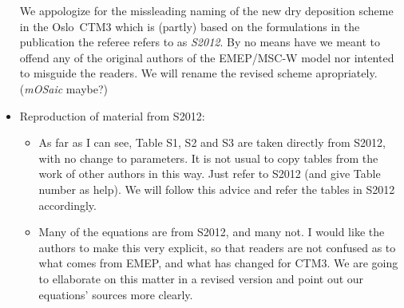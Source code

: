 \documentclass{scrartcl}
\begin{document}
\begin{itemize}
  We appologize for the missleading naming of the new dry deposition scheme in the Oslo~CTM3 which is (partly) based on the formulations in the publication the referee refers to as \emph{S2012}. By no means have we meant to offend any of the original authors of the EMEP/MSC-W model nor intented to misguide the readers. We will rename the revised scheme apropriately. (\emph{mOSaic} maybe?) 
\item {\color{blue} Reproduction of material from S2012:}
  \begin{itemize}
  \item {\color{blue} As far as I can see, Table S1, S2 and S3 are taken directly from S2012, with no change to parameters. It is not usual to copy tables from the work of other authors in this way.
    Just refer to S2012 (and give Table number as help).}
    We will follow this advice and refer the tables in S2012 accordingly.
  \item {\color{blue} Many of the equations are from S2012, and many not. I would like the authors to
    make this very explicit, so that readers are not confused as to what comes from EMEP,
    and what has changed for CTM3.}
    We are going to ellaborate on this matter in a revised version and point out our equations' sources more clearly.
  \end{itemize}
\end{itemize}
\end{document}
